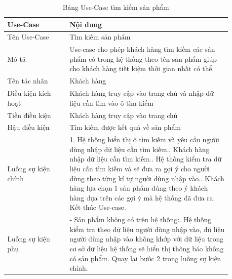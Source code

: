 \begin{longtable}[htp]{ |m{0.25\linewidth}|m{0.65\linewidth}|}
 \caption{Bảng Use-Case tìm kiếm sản phẩm \label{long}}\\
 \hline
 Use-Case & Nội dung \\
 \hline
 Tên Use-Case & Tìm kiếm sản phẩm \\
 \hline
 Mô tả & Use-case cho phép khách hàng tìm kiếm các sản phẩm có trong hệ thống theo tên sản phẩm giúp cho khách hàng tiết kiệm thời gian nhất có thể.\\
 \hline
 Tên tác nhân & Khách hàng\\
 \hline
 Điều kiện kích hoạt & Khách hàng truy cập vào trang chủ và nhập dữ liệu cần tìm vào ô tìm kiếm\\
 \hline
 Tiền điều kiện & Khách hàng truy cập vào trang chủ\\
 \hline
 Hậu điều kiện & Tìm kiếm được kết quả về sản phẩm\\
 \hline
 Luồng sự kiện chính & 
  1. Hệ thống hiển thị ô tìm kiếm và yêu cầu người dùng nhập dữ liệu cần tìm kiếm.\newline
  2. Khách hàng nhập dữ liệu cần tìm kiếm.\newline
  3. Hệ thống kiểm tra dữ liệu cần tìm kiếm và sẽ đưa ra gợi ý cho người dùng theo từng kí tự người dùng nhập vào.\newline
  4. Khách hàng lựa chọn 1 sản phẩm đúng theo ý khách hàng dựa trên các gợi ý mà hệ thống đã đưa ra\newline
  5. Kết thúc Use-case.	
 \\
 \hline
 Luồng sự kiện phụ & 
 - Sản phẩm không có trên hệ thống:\newline
 1. Hệ thống kiểm tra theo dữ liệu người dùng nhập vào, dữ liệu người dùng nhập vào không khớp với dữ liệu trong cơ sở dữ liệu hệ thống sẽ hiển thị thông báo không có sản phẩm.\newline
  Quay lại bước 2 trong luồng sự kiện chính.
 \\
 \hline
\end{longtable}

